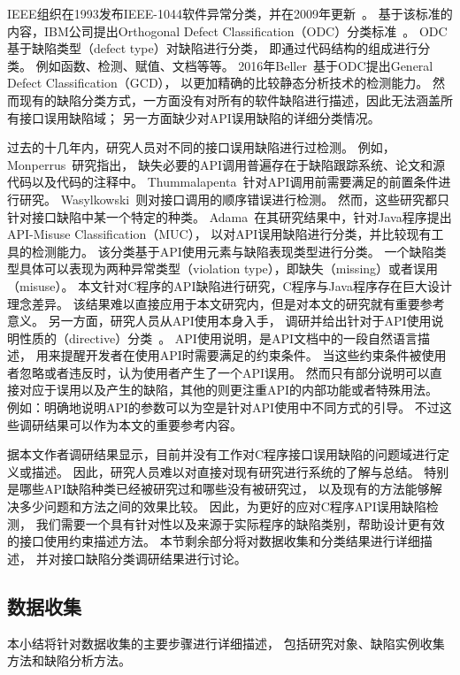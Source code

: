 IEEE组织在1993发布IEEE-1044软件异常分类，并在2009年更新~\cite{09-ieee-classification}。
基于该标准的内容，IBM公司提出Orthogonal Defect Classification（ODC）分类标准~\cite{92-tse-odc}。
ODC基于缺陷类型（defect type）对缺陷进行分类，
即通过代码结构的组成进行分类。
例如函数、检测、赋值、文档等等。
2016年Beller~\cite{16-saner-evaluation}基于ODC提出General Defect Classification（GCD），
以更加精确的比较静态分析技术的检测能力。
然而现有的缺陷分类方式，一方面没有对所有的软件缺陷进行描述，因此无法涵盖所有接口误用缺陷域；
另一方面缺少对API误用缺陷的详细分类情况。

过去的十几年内，研究人员对不同的接口误用缺陷进行过检测。
例如，Monperrus~\cite{13-tosem-missing-call}研究指出，
缺失必要的API调用普遍存在于缺陷跟踪系统、论文和源代码以及代码的注释中。
Thummalapenta~\cite{09-icse-exception}针对API调用前需要满足的前置条件进行研究。
Wasylkowski~\cite{07-fse-object}则对接口调用的顺序错误进行检测。
然而，这些研究都只针对接口缺陷中某一个特定的种类。
Adama~\cite{survey18}在其研究结果中，针对Java程序提出API-Misuse Classification（MUC），
以对API误用缺陷进行分类，并比较现有工具的检测能力。
该分类基于API使用元素与缺陷表现类型进行分类。
一个缺陷类型具体可以表现为两种异常类型（violation type），即缺失（missing）或者误用（misuse）。
本文针对C程序的API缺陷进行研究，C程序与Java程序存在巨大设计理念差异。
该结果难以直接应用于本文研究内，但是对本文的研究就有重要参考意义。
另一方面，研究人员从API使用本身入手，
调研并给出针对于API使用说明性质的（directive）分类~\cite{09-icse-doc,12-ese-directive}。
API使用说明，是API文档中的一段自然语言描述，
用来提醒开发者在使用API时需要满足的约束条件。
当这些约束条件被使用者忽略或者违反时，认为使用者产生了一个API误用。
然而只有部分说明可以直接对应于误用以及产生的缺陷，其他的则更注重API的内部功能或者特殊用法。
例如：明确地说明API的参数可以为空是针对API使用中不同方式的引导。
不过这些调研结果可以作为本文的重要参考内容。


据本文作者调研结果显示，目前并没有工作对C程序接口误用缺陷的问题域进行定义或描述。
因此，研究人员难以对直接对现有研究进行系统的了解与总结。
特别是哪些API缺陷种类已经被研究过和哪些没有被研究过，
以及现有的方法能够解决多少问题和方法之间的效果比较。
因此，为更好的应对C程序API误用缺陷检测，
我们需要一个具有针对性以及来源于实际程序的缺陷类别，帮助设计更有效的接口使用约束描述方法。
本节剩余部分将对数据收集和分类结果进行详细描述，
并对接口缺陷分类调研结果进行讨论。

\subsection{数据收集}
本小结将针对数据收集的主要步骤进行详细描述，
包括研究对象、缺陷实例收集方法和缺陷分析方法。

